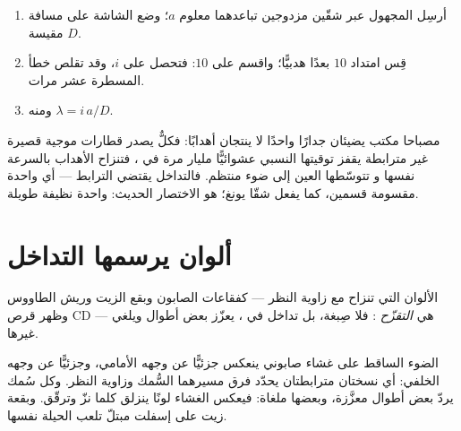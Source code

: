 \begin{method}\label{met:g12:light-as-wave:lambda}
\begin{enumerate}
  \item أرسِل  المجهول عبر شقّين مزدوجين تباعدهما معلوم
        $a$؛ وضع الشاشة على مسافة مقيسة $D$.
  \item قِس امتداد $10$ بعدًا هدبيًّا؛ واقسم على $10$: فتحصل على
         $i$، وقد تقلص خطأ المسطرة عشر مرات.
  \item ومنه $\lambda = i\,a/D$.
\end{enumerate}
\end{method}

\begin{remark}\label{rem:g12:light-as-wave:lamps}
مصباحا مكتب يضيئان جدارًا واحدًا لا ينتجان أهدابًا: فكلٌّ يصدر
قطارات موجية قصيرة غير مترابطة يقفز توقيتها النسبي عشوائيًّا
مليار مرة في ، فتنزاح الأهداب بالسرعة نفسها و
تتوسّطها العين إلى ضوء منتظم. فالتداخل يقتضي الترابط
--- أي  واحدة مقسومة قسمين، كما يفعل شقّا يونغ؛ 
هو الاختصار الحديث:  واحدة نظيفة طويلة.
\end{remark}

\section{ألوان يرسمها التداخل}

\begin{definition}[التقزّح]\label{def:g12:light-as-wave:iridescence}
الألوان التي تنزاح مع زاوية النظر --- كفقاعات الصابون وبقع الزيت
وريش الطاووس وظهر قرص CD --- هي \emph{التقزّح}%
: فلا صِبغة، بل تداخل في ،
يعزّز بعض أطوال  ويلغي غيرها.
\end{definition}

\begin{example}\label{ex:g12:light-as-wave:soap}
الضوء الساقط على غشاء صابوني ينعكس جزئيًّا عن وجهه الأمامي، وجزئيًّا
عن وجهه الخلفي: أي نسختان مترابطتان يحدّد فرق مسيرهما
السُّمك وزاوية النظر. وكل سُمك يردّ بعض
أطوال  معزَّزة، وبعضها ملغاة: فيعكس الغشاء لونًا
ينزلق كلما نزّ وترقّق. وبقعة زيت على إسفلت مبتلّ تلعب
الحيلة نفسها.
\end{example}

